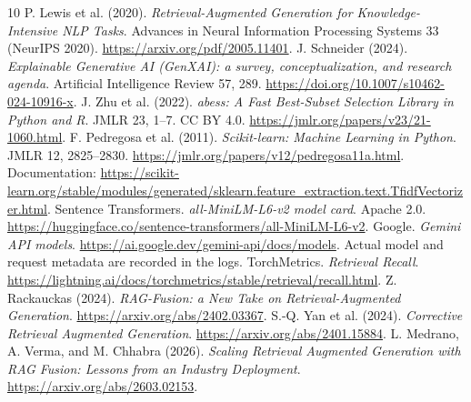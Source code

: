 \documentclass[12pt,a4paper]{article}
\begin{document}
\newpage
\begingroup\small
\begin{thebibliography}{10}
 P. Lewis et al. (2020). \textit{Retrieval-Augmented Generation for Knowledge-Intensive NLP Tasks}. Advances in Neural Information Processing Systems 33 (NeurIPS 2020). \url{https://arxiv.org/pdf/2005.11401}.
 J. Schneider (2024). \textit{Explainable Generative AI (GenXAI): a survey, conceptualization, and research agenda}. Artificial Intelligence Review 57, 289. \url{https://doi.org/10.1007/s10462-024-10916-x}.
 J. Zhu et al. (2022). \textit{abess: A Fast Best-Subset Selection Library in Python and R}. JMLR 23, 1--7. CC BY 4.0. \url{https://jmlr.org/papers/v23/21-1060.html}.
 F. Pedregosa et al. (2011). \textit{Scikit-learn: Machine Learning in Python}. JMLR 12, 2825--2830. \url{https://jmlr.org/papers/v12/pedregosa11a.html}. Documentation: \url{https://scikit-learn.org/stable/modules/generated/sklearn.feature_extraction.text.TfidfVectorizer.html}.
 Sentence Transformers. \textit{all-MiniLM-L6-v2 model card}. Apache 2.0. \url{https://huggingface.co/sentence-transformers/all-MiniLM-L6-v2}.
 Google. \textit{Gemini API models}. \url{https://ai.google.dev/gemini-api/docs/models}. Actual model and request metadata are recorded in the logs.
 TorchMetrics. \textit{Retrieval Recall}. \url{https://lightning.ai/docs/torchmetrics/stable/retrieval/recall.html}.
 Z. Rackauckas (2024). \textit{RAG-Fusion: a New Take on Retrieval-Augmented Generation}. \url{https://arxiv.org/abs/2402.03367}.
 S.-Q. Yan et al. (2024). \textit{Corrective Retrieval Augmented Generation}. \url{https://arxiv.org/abs/2401.15884}.
 L. Medrano, A. Verma, and M. Chhabra (2026). \textit{Scaling Retrieval Augmented Generation with RAG Fusion: Lessons from an Industry Deployment}. \url{https://arxiv.org/abs/2603.02153}.
\end{thebibliography}
\endgroup
\end{document}
